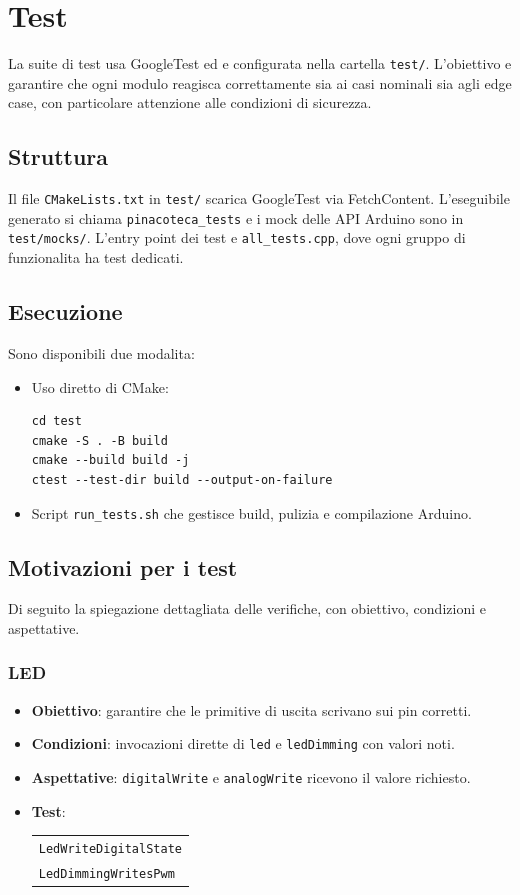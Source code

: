 \chapter{Test}

La suite di test usa GoogleTest ed e configurata nella cartella \texttt{test/}. L'obiettivo e garantire che ogni modulo reagisca correttamente sia ai casi nominali sia agli edge case, con particolare attenzione alle condizioni di sicurezza.

\section{Struttura}
Il file \texttt{CMakeLists.txt} in \texttt{test/} scarica GoogleTest via FetchContent.
L'eseguibile generato si chiama \texttt{pinacoteca\_tests} e i mock delle API Arduino sono in \texttt{test/mocks/}.
L'entry point dei test e \texttt{all\_tests.cpp}, dove ogni gruppo di funzionalita ha test dedicati.

\section{Esecuzione}
Sono disponibili due modalita:
\begin{itemize}
  \item Uso diretto di CMake:
  \begin{lstlisting}[style=cppstyle]
cd test
cmake -S . -B build
cmake --build build -j
ctest --test-dir build --output-on-failure
  \end{lstlisting}
  \item Script \texttt{run\_tests.sh} che gestisce build, pulizia e compilazione Arduino.
\end{itemize}

\section{Motivazioni per i test}
Di seguito la spiegazione dettagliata delle verifiche, con obiettivo, condizioni e aspettative.

\subsection{LED}
\begin{itemize}
  \item \textbf{Obiettivo}: garantire che le primitive di uscita scrivano sui pin corretti.
  \item \textbf{Condizioni}: invocazioni dirette di \texttt{led} e \texttt{ledDimming} con valori noti.
  \item \textbf{Aspettative}: \texttt{digitalWrite} e \texttt{analogWrite} ricevono il valore richiesto.
  \item \textbf{Test}:
  \begin{tabular}[t]{@{}l@{}}
    \texttt{LedWriteDigitalState}\\
    \texttt{LedDimmingWritesPwm}
  \end{tabular}
\end{itemize}

